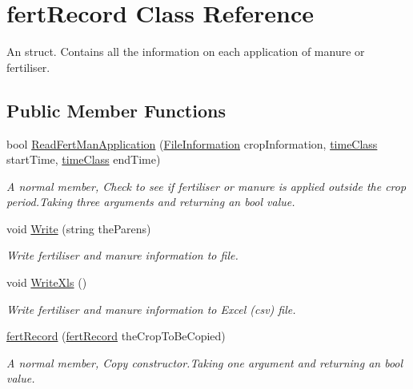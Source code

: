 \hypertarget{classfert_record}{}\section{fert\+Record Class Reference}
\label{classfert_record}


An struct. Contains all the information on each application of manure or fertiliser.  


\subsection*{Public Member Functions}
\begin{DoxyCompactItemize}
\item 
bool \mbox{\hyperlink{classfert_record_a2eb0f5970facf6762392870c5c6dcb65}{Read\+Fert\+Man\+Application}} (\mbox{\hyperlink{class_file_information}{File\+Information}} crop\+Information, \mbox{\hyperlink{classtime_class}{time\+Class}} start\+Time, \mbox{\hyperlink{classtime_class}{time\+Class}} end\+Time)
\begin{DoxyCompactList}\small\item\em A normal member, Check to see if fertiliser or manure is applied outside the crop period.\+Taking three arguments and returning an bool value. \end{DoxyCompactList}\item 
void \mbox{\hyperlink{classfert_record_a1c2c1943addbb5f6eb5e3fe244fa585b}{Write}} (string the\+Parens)
\begin{DoxyCompactList}\small\item\em Write fertiliser and manure information to file. \end{DoxyCompactList}\item 
\mbox{\label{classfert_record_a2874f8deff980009390d942b02d49bc5}} 
void \mbox{\hyperlink{classfert_record_a2874f8deff980009390d942b02d49bc5}{Write\+Xls}} ()
\begin{DoxyCompactList}\small\item\em Write fertiliser and manure information to Excel (csv) file. \end{DoxyCompactList}\item 
\mbox{\hyperlink{classfert_record_aec62ffe21df97c2b28e3c0c37a113d33}{fert\+Record}} (\mbox{\hyperlink{classfert_record}{fert\+Record}} the\+Crop\+To\+Be\+Copied)
\begin{DoxyCompactList}\small\item\em A normal member, Copy constructor.\+Taking one argument and returning an bool value. \end{DoxyCompactList}\item 

\end{DoxyCompactItemize}
